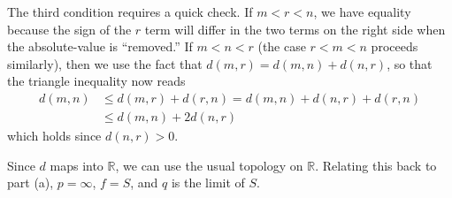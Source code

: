 \documentclass[11pt]{article}
\begin{document}
\begin{itemize}
The third condition requires a quick check.  If $m < r < n$, we have
equality because the sign of the $r$ term will differ in the two terms
on the right side when the absolute-value is ``removed.''  If $m < n <
r$ (the case $r < m < n$ proceeds similarly), then we use the fact
that $d(m,r) = d(m,n) + d(n,r)$, so that the triangle inequality now
reads
\begin{align}
  d(m,n) & \le d(m,r) + d(r,n) = d(m,n) + d(n,r) + d(r,n) \\
         & \le d(m,n) + 2d(n,r)
\end{align}
which holds since $d(n,r) > 0$.

Since $d$ maps into $\mathbb{R}$, we can use the usual topology on
$\mathbb{R}$.  Relating this back to part (a), $p = \infty$, $f = S$,
and $q$ is the limit of $S$.
\end{itemize}
\end{document}
